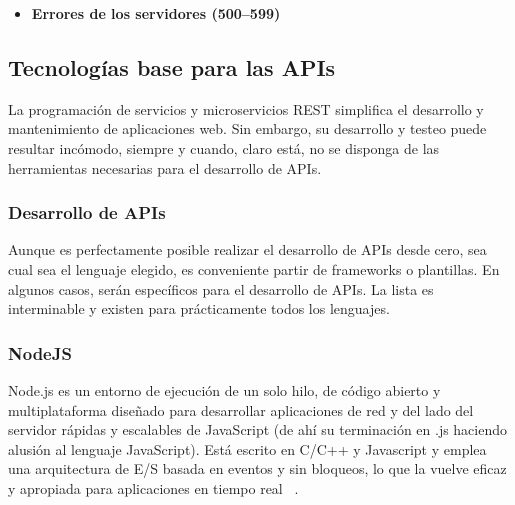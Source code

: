 \begin{itemize}
	\item \textbf{Errores de los servidores (500–599)}
\end{itemize}

\subsection{Tecnologías base para las APIs}
La programación de servicios y microservicios REST simplifica el desarrollo y mantenimiento de aplicaciones web. Sin embargo, su desarrollo y testeo puede resultar incómodo, siempre y cuando, claro está, no se disponga de las herramientas necesarias para el desarrollo de APIs.

\subsubsection{Desarrollo de APIs}
Aunque es perfectamente posible realizar el desarrollo de APIs desde cero, sea cual sea el lenguaje elegido, es conveniente partir de frameworks o plantillas. En algunos casos, serán específicos para el desarrollo de APIs. La lista es interminable y existen para prácticamente todos los lenguajes. 

\subsubsection{NodeJS}
Node.js es un entorno de ejecución de un solo hilo, de código abierto y multiplataforma diseñado para desarrollar aplicaciones de red y del lado del servidor rápidas y escalables de JavaScript (de ahí su terminación en .js haciendo alusión al lenguaje JavaScript). Está escrito en C/C++ y Javascript y emplea una arquitectura de E/S basada en eventos y sin bloqueos, lo que la vuelve eficaz y apropiada para aplicaciones en tiempo real ~\cite{NodeJSKinsta}. 

